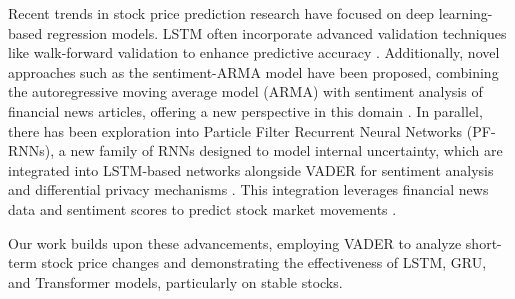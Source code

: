Recent trends in stock price prediction research have focused on deep learning-based regression models. 
LSTM often incorporate advanced validation techniques like walk-forward validation to enhance predictive accuracy \cite{li2019dp}. 
Additionally, novel approaches such as the sentiment-ARMA model have been proposed, combining the autoregressive moving average model (ARMA) with sentiment analysis of financial news articles, offering a new perspective in this domain \cite{mehtab2021stock}.
In parallel, there has been exploration into Particle Filter Recurrent Neural Networks (PF-RNNs), a new family of RNNs designed to model internal uncertainty, which are integrated into LSTM-based networks alongside VADER for sentiment analysis and differential privacy mechanisms \cite{ma2020particle}. 
This integration leverages financial news data and sentiment scores to predict stock market movements \cite{li2019dp}\cite{li2022novel}. 

Our work builds upon these advancements, employing VADER to analyze short-term stock price changes and demonstrating the effectiveness of LSTM, GRU, and Transformer models, particularly on stable stocks.